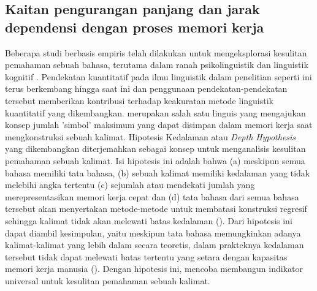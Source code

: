 \subsection{Kaitan pengurangan panjang dan jarak dependensi dengan proses memori kerja}
Beberapa studi berbasis empiris telah dilakukan untuk mengeksplorasi kesulitan pemahaman sebuah bahasa, terutama dalam ranah psikolinguistik dan linguistik kognitif \citep{jay2003psychology}. Pendekatan kuantitatif pada ilmu linguistik dalam penelitian seperti ini terus berkembang hingga saat ini dan penggunaan pendekatan-pendekatan tersebut memberikan kontribusi terhadap keakuratan metode linguistik kuantitatif yang dikembangkan. \cite{yngve1960model} merupakan salah satu linguis yang mengajukan konsep jumlah 'simbol' maksimum yang dapat disimpan dalam memori kerja saat mengkonstruksi sebuah kalimat. Hipotesis Kedalaman atau \textit{Depth Hypothesis} yang dikembangkan \cite{yngve1960model} diterjemahkan sebagai konsep untuk menganalisis kesulitan pemahaman sebuah kalimat. Isi hipotesis ini adalah bahwa (a) meskipun semua bahasa memiliki tata bahasa, (b) sebuah kalimat memiliki kedalaman yang tidak melebihi angka tertentu (c) sejumlah atau mendekati jumlah yang merepresentasikan memori kerja cepat dan (d) tata bahasa dari semua bahasa tersebut akan menyertakan metode-metode untuk membatasi konstruksi regresif sehingga kalimat tidak akan melewati batas kedalaman (\citealp{yngve1960model, yngve1996grammar}). Dari hipotesis ini dapat diambil kesimpulan, yaitu meskipun tata bahasa memungkinkan adanya kalimat-kalimat yang lebih dalam secara teoretis, dalam prakteknya kedalaman tersebut tidak dapat melewati batas tertentu yang setara dengan kapasitas memori kerja manusia (\citealp{miller1956magical,cowan2001metatheory}). Dengan hipotesis ini, \cite{yngve1960model} mencoba membangun indikator universal untuk kesulitan pemahaman sebuah kalimat. 

